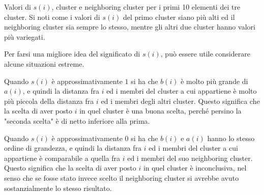 \documentclass[italian]{article}
\begin{document}
			\begin{table}
				\begin{boxedminipage}{0.25\linewidth}
				\end{boxedminipage}
				\begin{boxedminipage}{0.25\linewidth}
				\end{boxedminipage}
				\begin{boxedminipage}{0.25\linewidth}
				\end{boxedminipage}
				\caption{Valori di $s(i)$, cluster e neighboring cluster per
				i primi 10 elementi dei tre cluster. Si noti come i valori
				di $s(i)$ del primo cluster siano più alti ed il neighboring
				cluster sia sempre lo stesso, mentre gli altri due cluster
				hanno valori più variegati.}
				\label{tab:iris}
			\end{table}

			Per farsi una migliore idea del significato di $s(i)$, può essere
			utile considerare alcune situazioni estreme.

			Quando $s(i)$ è approssimativamente $1$ si ha che $b(i)$ è molto
			più grande di $a(i)$, e quindi la distanza fra $i$ ed i membri del
			cluster a cui appartiene è molto più piccola della distanza fra $i$
			ed i membri degli altri cluster. Questo significa che la scelta di
			aver posto $i$ in quel cluster è una buona scelta, perché persino
			la "seconda scelta" è di netto inferiore alla prima.

			Quando $s(i)$ è approssimativamente $0$ si ha che $b(i)$ e $a(i)$
			hanno lo stesso ordine di grandezza, e quindi la distanza fra $i$
			ed i membri del cluster a cui appartiene è comparabile a quella
			fra $i$ ed i membri del suo neighboring cluster. Questo significa
			che la scelta di aver posto $i$ in quel cluster è inconclusiva,
			nel senso che se fosse stato invece scelto il neighboring cluster
			si avrebbe avuto sostanzialmente lo stesso risultato.
\end{document}
